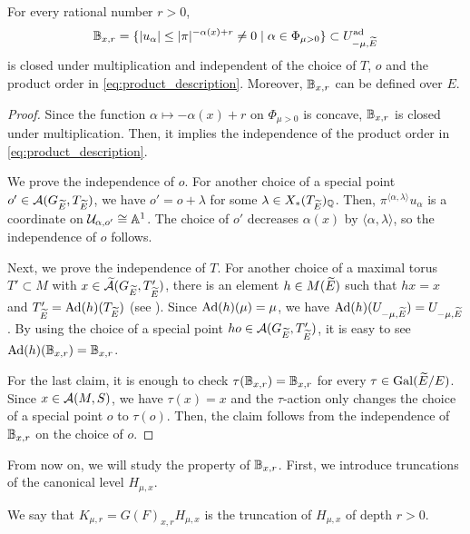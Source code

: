 \documentclass[12pt,reqno]{amsart}
\begin{document}
\begin{prop} \label{prop:definition_B_xr}
    For every rational number $r > 0$,
    \[
        \mathbb{B}_{x, r} = \{ \lvert u_\alpha \rvert \leq \lvert \pi \rvert^{- \alpha(x) + r} \neq 0 \mid\alpha \in \Phi_{\mu > 0} \} \subset U_{-\mu, {\widetilde{E}}}^{\operatorname{ad}}
    \]
    is closed under multiplication and independent of the choice of $T$, $o$ and the product order in \eqref{eq:product_description}. Moreover, $\mathbb{B}_{x, r}$ can be defined over $E$. 
\end{prop}
\begin{proof}
    Since the function $\alpha \mapsto - \alpha(x) + r$ on $\Phi_{\mu > 0}$ is concave, $\mathbb{B}_{x, r}$ is closed under multiplication. Then, it implies the independence of the product order in \eqref{eq:product_description}. 

    We prove the independence of $o$. For another choice of a special point $o' \in {\mathcal{A}}(G_{{\widetilde{E}}}, T_{{\widetilde{E}}})$, we have $o' = o + \lambda$ for some $\lambda \in X_*(T_{{\widetilde{E}}})_{\mathbb{Q}}$. Then, $\pi^{ \langle \alpha, \lambda \rangle} u_\alpha$ is a coordinate on ${\mathcal{U}}_{\alpha, o'} \cong \mathbb{A}^1$. The choice of $o'$ decreases $\alpha(x)$ by $\langle \alpha, \lambda \rangle$, so the independence of $o$ follows. 

    Next, we prove the independence of $T$. For another choice of a maximal torus $T' \subset M$ with $x \in {\widetilde{{\mathcal{A}}}}(G_{{\widetilde{E}}}, T'_{{\widetilde{E}}})$, there is an element $h \in M({\widetilde{E}})$ such that $h x = x$ and $T'_{{\widetilde{E}}} = {\operatorname{Ad}}(h)(T_{{\widetilde{E}}})$ (see \cite[4.1.12 (3)]{KP23}). Since ${\operatorname{Ad}}(h)(\mu) = \mu$, we have ${\operatorname{Ad}}(h)(U_{-\mu, {\widetilde{E}}}) = U_{-\mu, {\widetilde{E}}}$. By using the choice of a special point $ho \in {\mathcal{A}}(G_{{\widetilde{E}}}, T'_{{\widetilde{E}}})$, it is easy to see ${\operatorname{Ad}}(h)(\mathbb{B}_{x, r}) = \mathbb{B}_{x, r}$. 

    For the last claim, it is enough to check $\tau(\mathbb{B}_{x, r}) = \mathbb{B}_{x, r}$ for every $\tau \in {\operatorname{Gal}}({\widetilde{E}} / E)$. Since $x \in {\mathcal{A}}(M, S)$, we have $\tau(x) = x$ and the $\tau$-action only changes the choice of a special point $o$ to $\tau(o)$. Then, the claim follows from the independence of $\mathbb{B}_{x, r}$ on the choice of $o$. 
\end{proof}

From now on, we will study the property of $\mathbb{B}_{x, r}$. First, we introduce truncations of the canonical level $H_{\mu, x}$. 

\begin{defi}
    We say that $K_{\mu, r} = G(F)_{x, r} H_{\mu, x}$ is the truncation of $H_{\mu, x}$ of depth $r > 0$. %
\end{defi}
\end{document}
